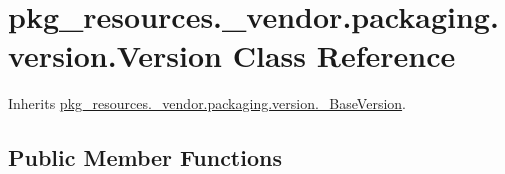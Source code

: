 \hypertarget{classpkg__resources_1_1__vendor_1_1packaging_1_1version_1_1_version}{}\section{pkg\+\_\+resources.\+\_\+vendor.\+packaging.\+version.\+Version Class Reference}
\label{classpkg__resources_1_1__vendor_1_1packaging_1_1version_1_1_version}


Inherits \hyperlink{classpkg__resources_1_1__vendor_1_1packaging_1_1version_1_1___base_version}{pkg\+\_\+resources.\+\_\+vendor.\+packaging.\+version.\+\_\+\+Base\+Version}.

\subsection*{Public Member Functions}
